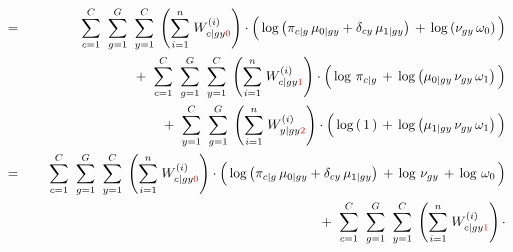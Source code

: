 \begin{enumerate}
\begin{eqnarray*}
&=&
	{\color{white}+} \;\;
	\overset{C}{\underset{c=1}{\sum}}\;\;
	\overset{G}{\underset{g=1}{\sum}}\;\;
	\overset{C}{\underset{y=1}{\sum}}\;
	\left(\overset{n}{\underset{i=1}{\sum}}\;W^{(i)}_{c \vert gy{\color{red}0}}\right)
	\cdot
	\left(\,
		\log\left(\pi_{c \vert g}\,\mu_{0 \vert gy} + \delta_{cy}\,\mu_{1\vert gy}\right)
		\,\overset{{\color{white}.}}{+}\,
		\log\left(\nu_{gy}\,\omega_{0}\right)
	\,\right)
\\
&&
	+ \;\;
	\overset{C}{\underset{c=1}{\sum}}\;\;
	\overset{G}{\underset{g=1}{\sum}}\;\;
	\overset{C}{\underset{y=1}{\sum}}\;
	\left(\overset{n}{\underset{i=1}{\sum}}\;W^{(i)}_{c \vert gy{\color{red}1}}\right)
	\cdot
	\left(\,
		\log\,\pi_{c \vert g}
		\,\overset{{\color{white}.}}{+}\,
		\log\left(\mu_{0\vert gy}\,\nu_{gy}\,\omega_{1}\right)
	\,\right)
\\
&&
	+ \;\;
	\overset{C}{\underset{y=1}{\sum}}\;\;
	\overset{G}{\underset{g=1}{\sum}}\;
	\left(\overset{n}{\underset{i=1}{\sum}}\;W^{(i)}_{y \vert gy{\color{red}2}}\right)
	\cdot
	\left(\,
		\log\left(\,1\,\right)
		\,\overset{{\color{white}.}}{+}\,
		\log\left(\mu_{1 \vert gy}\,\nu_{gy}\,\omega_{1}\right)
	\,\right)
\\
&=&
	{\color{white}+} \;\;
	\overset{C}{\underset{c=1}{\sum}}\;\;
	\overset{G}{\underset{g=1}{\sum}}\;\;
	\overset{C}{\underset{y=1}{\sum}}\;
	\left(\overset{n}{\underset{i=1}{\sum}}\;W^{(i)}_{c \vert gy{\color{red}0}}\right)
	\cdot
	\left(\,
		\log\left(\pi_{c \vert g}\,\mu_{0 \vert gy} + \delta_{cy}\,\mu_{1\vert gy}\right)
		\,\overset{{\color{white}.}}{+}\,
		\log\,\nu_{gy}
		\,\overset{{\color{white}.}}{+}\,
		\log\,\omega_{0}
	\,\right)
\\
&&
	+ \;\;
	\overset{C}{\underset{c=1}{\sum}}\;\;
	\overset{G}{\underset{g=1}{\sum}}\;\;
	\overset{C}{\underset{y=1}{\sum}}\;
	\left(\overset{n}{\underset{i=1}{\sum}}\;W^{(i)}_{c \vert gy{\color{red}1}}\right)
	\cdot

\end{eqnarray*}
\end{enumerate}
